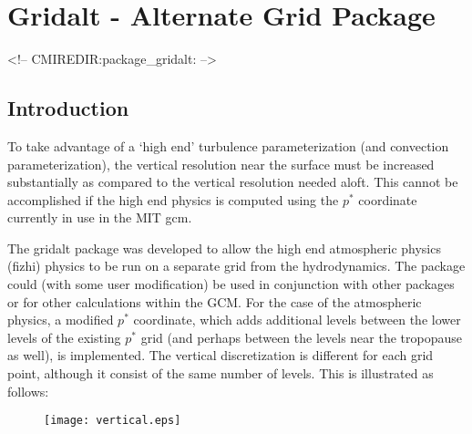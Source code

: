 \section{Gridalt - Alternate Grid Package}
\label{sec:pkg:gridalt}
\begin{rawhtml}
<!-- CMIREDIR:package_gridalt: -->
\end{rawhtml}

\subsection {Introduction} 
To take advantage of a `high end' turbulence parameterization
(and convection parameterization), the vertical resolution near the surface
must be increased substantially as compared to the vertical resolution needed
aloft. This cannot be accomplished if the high end physics is computed using 
the $p^*$ coordinate currently in use in the MIT gcm. 

The gridalt package was developed to allow the high end atmospheric physics 
(fizhi) physics to be run on a separate grid from the hydrodynamics. The package
could (with some user modification) be used in conjunction with other packages 
or for other calculations within the GCM. For the case of the atmospheric 
physics, a modified $p^*$ coordinate, which adds additional levels between
the lower levels of the existing $p^*$ grid (and perhaps between the levels near 
the tropopause as well), is implemented. The vertical discretization is
different for each grid point, although it consist of the same number of 
levels. This is illustrated as follows:
\begin{figure}[htbp]
\vspace*{-0.4in}
\begin{center}
\texttt{[image: vertical.eps]}
\end{center}
\end{figure}

